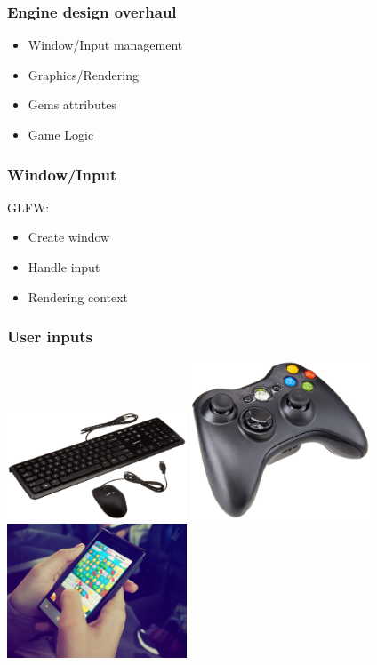 \documentclass{beamer}
\begin{document}
    \begin{frame}
        \frametitle{Engine design overhaul}
        \begin{itemize}
            \item Window/Input management
            \item Graphics/Rendering
            \item Gems attributes
            \item Game Logic 
        \end{itemize}
    \end{frame}

    \begin{frame}
        \frametitle{Window/Input}
        GLFW:
        \begin{itemize}
            \item Create window
            \item Handle input 
            \item Rendering context 
        \end{itemize}
    \end{frame}

    \begin{frame}
        \frametitle{User inputs}
        \includegraphics[width=0.4\textwidth]{keyboard.jpg}
        \includegraphics[width=0.4\textwidth]{xbox360.jpg}
        \includegraphics[width=0.4\textwidth]{finger.jpg}
    \end{frame}
\end{document}
